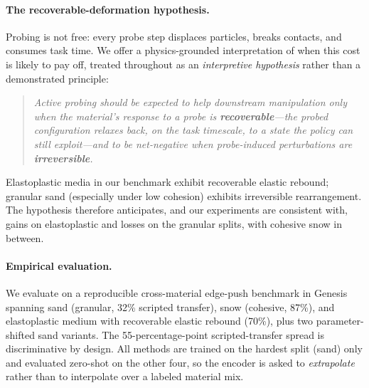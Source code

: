 \paragraph{The recoverable-deformation hypothesis.}
Probing is not free: every probe step displaces particles, breaks contacts, and consumes task time. We offer a physics-grounded interpretation of when this cost is likely to pay off, treated throughout as an \emph{interpretive hypothesis} rather than a demonstrated principle:
\begin{quote}
\emph{Active probing should be expected to help downstream manipulation only when the material's response to a probe is \textbf{recoverable}---the probed configuration relaxes back, on the task timescale, to a state the policy can still exploit---and to be net-negative when probe-induced perturbations are \textbf{irreversible}.}
\end{quote}
Elastoplastic media in our benchmark exhibit recoverable elastic rebound; granular sand (especially under low cohesion) exhibits irreversible rearrangement. The hypothesis therefore anticipates, and our experiments are consistent with, gains on elastoplastic and losses on the granular splits, with cohesive snow in between.

\paragraph{Empirical evaluation.}
We evaluate \PTA{} on a reproducible cross-material edge-push benchmark in Genesis~\cite{genesis2024} spanning sand (granular, 32\% scripted transfer), snow (cohesive, 87\%), and elastoplastic medium with recoverable elastic rebound (70\%), plus two parameter-shifted sand variants. The 55-percentage-point scripted-transfer spread is discriminative by design. All methods are trained on the hardest split (sand) only and evaluated zero-shot on the other four, so the encoder is asked to \emph{extrapolate} rather than to interpolate over a labeled material mix.

